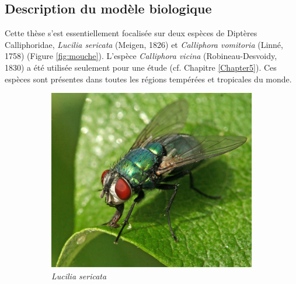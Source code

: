  
\subsection{Description du modèle biologique}

Cette thèse s'est essentiellement focalisée sur deux espèces de Diptères Calliphoridae, \textit{Lucilia sericata} (Meigen, 1826) et \textit{Calliphora vomitoria} (Linné, 1758) (Figure \ref{fig:mouche}). L'espèce \textit{Calliphora vicina} (Robineau-Desvoidy, 1830) a été utilisée seulement pour une étude (cf. Chapitre \ref{Chapter5}). Ces espèces sont présentes dans toutes les régions tempérées et tropicales du monde. 

\begin{figure}[ht]
	\centering	
        \begin{subfigure}{0.25\textwidth}
			\includegraphics[width=\linewidth]{Figures/210509alf537luciliaw.pdf}
			\caption{\textit{Lucilia sericata}}
				\label{sub:lucilia}
		\end{subfigure}
		\begin{subfigure}{0.265\textwidth}

\end{subfigure}
\end{figure}
